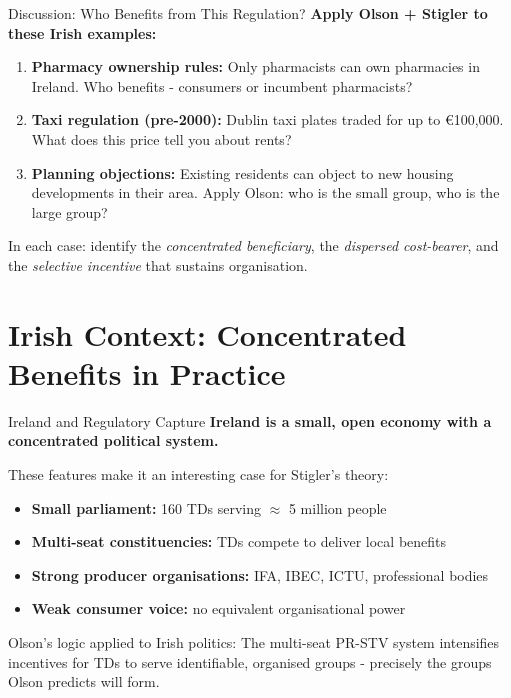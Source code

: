 \documentclass[10pt]{beamer}
\begin{document}
\begin{frame}{Discussion: Who Benefits from This Regulation?}
\textbf{Apply Olson + Stigler to these Irish examples:}

\vspace{0.1cm}
\begin{enumerate}
\item \textbf{Pharmacy ownership rules:}
Only pharmacists can own pharmacies in Ireland. Who benefits - consumers or incumbent pharmacists?

\vspace{0.1cm}
\item \textbf{Taxi regulation (pre-2000):}
Dublin taxi plates traded for up to \euro 100,000. What does this price tell you about rents?

\vspace{0.1cm}
\item \textbf{Planning objections:}
Existing residents can object to new housing developments in their area.
Apply Olson: who is the small group, who is the large group?
\end{enumerate}

\vspace{0.1cm}
\alert{In each case:} identify the \emph{concentrated beneficiary}, the \emph{dispersed cost-bearer}, and the \emph{selective incentive} that sustains organisation.
\end{frame}


\section{Irish Context: Concentrated Benefits in Practice}

\begin{frame}{Ireland and Regulatory Capture}
\textbf{Ireland is a small, open economy with a concentrated political system.}

These features make it an interesting case for Stigler's theory:
\begin{itemize}
\item \textbf{Small parliament:} 160 TDs serving $\approx$ 5 million people
\item \textbf{Multi-seat constituencies:} TDs compete to deliver local benefits
\item \textbf{Strong producer organisations:} IFA, IBEC, ICTU, professional bodies
\item \textbf{Weak consumer voice:} no equivalent organisational power
\end{itemize}

\vspace{0.1cm}
\alert{Olson's logic applied to Irish politics:}
The multi-seat PR-STV system intensifies incentives for TDs to serve identifiable, organised groups - precisely the groups Olson predicts will form.
\end{frame}
\end{document}
